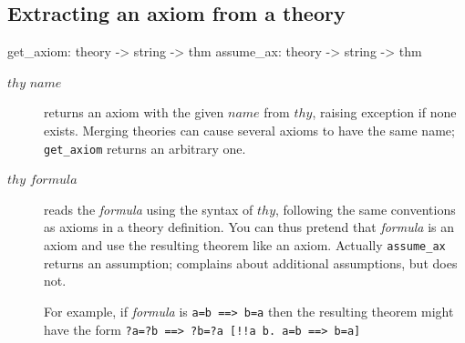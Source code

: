 \subsection{Extracting an axiom from a theory}
\begin{ttbox} 
get_axiom: theory -> string -> thm
assume_ax: theory -> string -> thm
\end{ttbox}
\begin{description}
\item[ $thy$ $name$] 
returns an axiom with the given $name$ from $thy$, raising exception
 if none exists.  Merging theories can cause several axioms
to have the same name; {\tt get_axiom} returns an arbitrary one.

\item[ $thy$ $formula$] 
  reads the {\it formula} using the syntax of $thy$, following the same
  conventions as axioms in a theory definition.  You can thus pretend that
  {\it formula} is an axiom and use the resulting theorem like an axiom.
  Actually {\tt assume_ax} returns an assumption;  
  complains about additional assumptions, but  does not.

For example, if {\it formula} is
\hbox{\tt a=b ==> b=a} then the resulting theorem might have the form
\hbox{\tt\frenchspacing ?a=?b ==> ?b=?a  [!!a b. a=b ==> b=a]}
\end{description}

